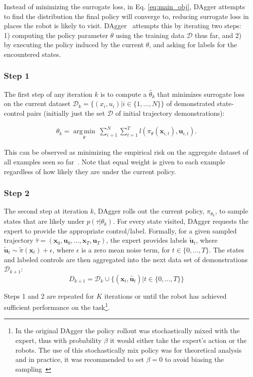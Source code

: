 \documentclass[10pt, conference]{ieeeconf}      %
\DeclareMathOperator*{\argmin}{arg\,min}
\newcommand{\bu}{\mathbf{u}}
\newcommand{\bx}{\mathbf{x}}
\begin{document}
Instead of  minimizing the surrogate loss, in Eq. \ref{eq:main_obj},  DAgger attempts to find the distribution the final policy will converge to, reducing surrogate loss in places the robot is likely to visit.
DAgger~\cite{ross2010reduction} attempts this by iterating two steps: 1)
computing the policy parameter $\theta$ using the training data $\mathcal{D}$ thus far, and 2) by executing the policy
induced by the current $\theta$, and asking for labels for the encountered states. 
 
\subsubsection{Step 1}
The first step of any iteration $k$ is to compute a $\hat{\theta}_k$ that minimizes surrogate loss on the current dataset $\mathcal{D}_k=\{(x_i,u_i)|i\in\{1,\ldots,N\}\}$ of demonstrated state-control pairs (initially just the set $\mathcal{D}$ of initial trajectory demonstrations):

 \vspace{-1ex}
\begin{align}\label{eq:super_objj}
\theta_{k} = \underset{\theta}{\argmin} \: \sum_{i=1}^{N} \sum_{t=1}^T  l(\pi_{\theta}(\bx_{i,t}),\bu_{i,t}).
\end{align}

This can be observed as minimizing the empirical risk on the aggregate dataset of all examples seen so far~\cite{scholkopf2002learning}.  Note that equal weight is given to each example regardless of how likely they are under the current policy.
 

 \subsubsection{Step 2}
The second step at iteration $k$, DAgger rolls out the current policy, $\pi_{\theta_{k}}$, to sample states that are likely under $p(\tau|\theta_{k})$.  For every state visited, DAgger requests the expert to provide the appropriate control/label. Formally, for a given sampled trajectory  $\hat{\tau} = (\bx_0,\bu_0,...,\bx_T,\bu_T )$, the expert provides labels $\tilde{\bu}_t$, where $\tilde{\bu}_t \sim \tilde{\pi}(\bx_t) + \epsilon$, where $\epsilon$ is a  zero mean noise term, for $t\in \{0, \ldots, T\}$.
The states and labeled controls are then aggregated into the next data set of demonstrations $\mathcal{D}_{k+1}$:
$$D_{k+1}=\mathcal{D}_k \cup \{(\bx_t,\tilde{\bu_t})|t\in\{0,\ldots,T\}\} $$

Steps 1 and 2 are repeated for $K$ iterations or until the robot has achieved sufficient performance on the
task\footnote{In the original DAgger the policy rollout was stochastically mixed with the expert, thus with
    probability $\beta$ it would either take the expert's action or the robots. The use of this stochastically mix
    policy was for theoretical analysis and in practice, it was recommended to set $\beta = 0$ to avoid biasing the
sampling~\cite{NIPS2014_5421,ross2010reduction}}.
\end{document}
